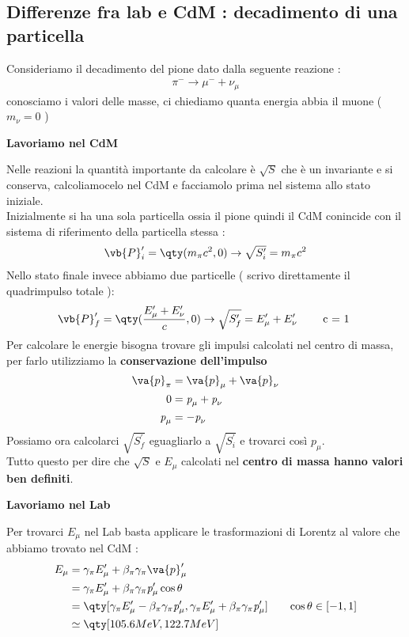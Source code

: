 \documentclass[a4paper, 12pt, twoside]{report}
\begin{document}
\subsection{Differenze fra lab e CdM : decadimento di una particella}
Consideriamo il decadimento del pione dato dalla seguente reazione : 
\begin{align*}
    \pi^{-} \rightarrow \mu^{-} + \nu_{\mu}
\end{align*}
conosciamo i valori delle masse, ci chiediamo quanta energia abbia il muone ( $m_{\nu} = 0$ )
\begin{center}\textbf{Lavoriamo nel CdM}\end{center}
Nelle reazioni la quantità importante da calcolare è $\sqrt{S}$ che è un invariante e si conserva, calcoliamocelo nel CdM e 
facciamolo prima nel sistema allo stato iniziale.\\
Inizialmente si ha una sola particella ossia il pione quindi il CdM conincide con il sistema di riferimento della particella stessa : 
\begin{align*}
        \vb{P}^{\prime}_{i} = \qty(m_{\pi}c^2,0) \rightarrow \sqrt{S^{\prime}_{i}} = m_{\pi}c^2
\end{align*}
Nello stato finale invece abbiamo due particelle ( scrivo direttamente il quadrimpulso totale ): 
\begin{align*}
        \vb{P}^{\prime}_{f} = \qty(\frac{E^{\prime}_{\mu} + E^{\prime}_{\nu}}{c},0) \rightarrow \sqrt{S^{\prime}_{f}} = E^{\prime}_{\mu} + E^{\prime}_{\nu} \tag*{ c = 1 }
\end{align*}
Per calcolare le energie bisogna trovare gli impulsi calcolati nel centro di massa, per farlo utilizziamo la \textbf{ conservazione dell'impulso }
\begin{align*}
        \va{p}_{\pi} &= \va{p}_{\mu} + \va{p}_{\nu} \\
        0 &= \textit{p}_{\mu} + \textit{p}_{\nu}\\
        \textit{p}_{\mu} &= - \textit{p}_{\nu}
\end{align*}
Possiamo ora calcolarci $\sqrt{S^{\prime}_{f}}$ eguagliarlo a $\sqrt{S^{\prime}_{i}}$ e trovarci così $\textit{p}_{\mu}$. \\
Tutto questo per dire che $\sqrt{S}$ e $E_{\mu}$ calcolati nel \textbf{centro di massa hanno valori ben definiti}. \\
\begin{center}\textbf{Lavoriamo nel Lab}\end{center}
Per trovarci $E_{\mu}$ nel Lab basta applicare le trasformazioni di Lorentz al valore che abbiamo trovato nel CdM : 
\begin{align*}
        E_{\mu} &= \gamma_{\pi}E^{\prime}_{\mu} + \beta_{\pi}\gamma_{\pi}\va{p}^{\prime}_{\mu} \\
                &= \gamma_{\pi}E^{\prime}_{\mu} + \beta_{\pi}\gamma_{\pi}\textit{p}^{\prime}_{\mu}\cos{\theta}\\
                &= \qty[\gamma_{\pi}E^{\prime}_{\mu} - \beta_{\pi}\gamma_{\pi}\textit{p}^{\prime}_{\mu} , \gamma_{\pi}E^{\prime}_{\mu} + \beta_{\pi}\gamma_{\pi}\textit{p}^{\prime}_{\mu}]  \tag*{$\cos{\theta} \in [-1,1]$} \\
                &\simeq \qty[105.6 MeV , 122.7 MeV]
\end{align*}
\end{document}
